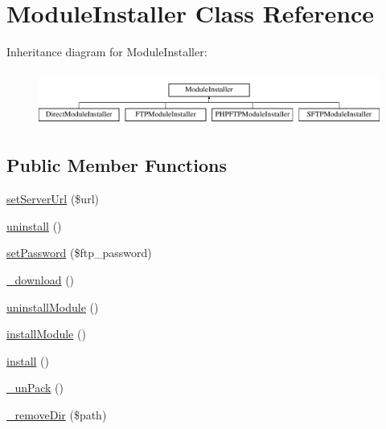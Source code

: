 \hypertarget{classModuleInstaller}{}\section{Module\+Installer Class Reference}
\label{classModuleInstaller}
Inheritance diagram for Module\+Installer\+:\begin{figure}[H]
\begin{center}
\leavevmode
\includegraphics[height=1.818182cm]{classModuleInstaller}
\end{center}
\end{figure}
\subsection*{Public Member Functions}
\begin{DoxyCompactItemize}
\item 
\hyperlink{classModuleInstaller_a4b4f25bccb1203ee61ff75dd1a0e0964}{set\+Server\+Url} (\$url)
\item 
\hyperlink{classModuleInstaller_a641ebe46305e7c320eec21a13d7e029f}{uninstall} ()
\item 
\hyperlink{classModuleInstaller_ad0cad9e399cc3a7de3f742d43364e96a}{set\+Password} (\$ftp\+\_\+password)
\item 
\hyperlink{classModuleInstaller_aeaa5ff80b85cbf6718f19e755fcbc016}{\+\_\+download} ()
\item 
\hyperlink{classModuleInstaller_a9ab463e12e9685dc42d4223b86a92754}{uninstall\+Module} ()
\item 
\hyperlink{classModuleInstaller_a07eb4b03dfd704124e05142cef5c9e82}{install\+Module} ()
\item 
\hyperlink{classModuleInstaller_aada761e2e31fc610bb69680991813bf8}{install} ()
\item 
\hyperlink{classModuleInstaller_a4b669f44350c27a508c2aac3180836f6}{\+\_\+un\+Pack} ()
\item 
\hyperlink{classModuleInstaller_a1d67a0ab016c393b15df54dabff74e9b}{\+\_\+remove\+Dir} (\$path)
\end{DoxyCompactItemize}
